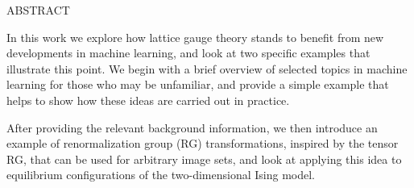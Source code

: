 \begin{doublespace}
\begin{tightcenter}
ABSTRACT
\mylinespacing%
\end{tightcenter}


%
In this work we explore how lattice gauge theory stands to benefit from new developments in machine learning, and look
at two specific examples that illustrate this point.
%
We begin with a brief overview of selected topics in machine learning for those who may be unfamiliar, and provide a
simple example that helps to show how these ideas are carried out in practice.


After providing the relevant background information, we then introduce an example of renormalization group (RG)
transformations, inspired by the tensor RG, that can be used for arbitrary image sets, and look at applying this idea
to equilibrium configurations of the two-dimensional Ising model.


\end{doublespace}
